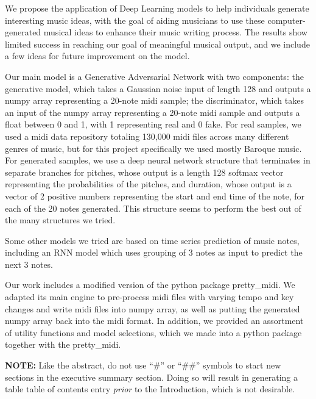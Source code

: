 \documentclass[12pt,oneside]{chicagocapstone}
\begin{document}
  \begin{executive}
    We propose the application of Deep Learning models to help individuals generate interesting music ideas, with the goal of aiding musicians to use these computer-generated musical ideas to enhance their music writing process. The results show limited success in reaching our goal of meaningful musical output, and we include a few ideas for future improvement on the model.
    
    Our main model is a Generative Adversarial Network with two components: the generative model, which takes a Gaussian noise input of length 128 and outputs a numpy array representing a 20-note midi sample; the discriminator, which takes an input of the numpy array representing a 20-note midi sample and outputs a float between 0 and 1, with 1 representing real and 0 fake. For real samples, we used a midi data repository totaling 130,000 midi files across many different genres of music, but for this project specifically we used mostly Baroque music. For generated samples, we use a deep neural network structure that terminates in separate branches for pitches, whose output is a length 128 softmax vector representing the probabilities of the pitches, and duration, whose output is a vector of 2 positive numbers representing the start and end time of the note, for each of the 20 notes generated. This structure seems to perform the best out of the many structures we tried.
    
    Some other models we tried are based on time series prediction of music notes, including an RNN model which uses grouping of 3 notes as input to predict the next 3 notes.
    
    Our work includes a modified version of the python package pretty\_midi. We adapted its main engine to pre-process midi files with varying tempo and key changes and write midi files into numpy array, as well as putting the generated numpy array back into the midi format. In addition, we provided an assortment of utility functions and model selections, which we made into a python package together with the pretty\_midi.
    
    \bigskip
    \bigskip
    \bigskip
    
    \textbf{NOTE:} Like the abstract, do not use ``\#'' or ``\#\#'' symbols to start new sections in the executive summary section. Doing so will result in generating a table table of contents entry \emph{prior} to the Introduction, which is not desirable.
  \end{executive}
\end{document}
